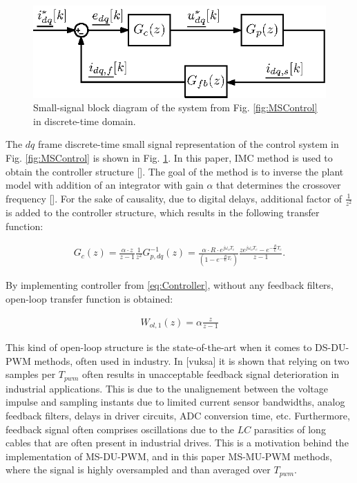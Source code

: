 \documentclass[journal]{IEEEtran}
\begin{document}
\begin{figure}[t!]
    \centerline{\includegraphics[width=0.95\linewidth]{figures/small_signal.eps}}
    \caption{Small-signal block diagram of the system from Fig. \ref{fig:MSControl} in discrete-time domain.}
    \label{fig:SmallSignal}
\end{figure}

The $dq$ frame discrete-time small signal representation of the control system in Fig. \ref{fig:MSControl} is shown in Fig. \ref{fig:SmallSignal}. In this paper, IMC method is used to obtain the controller structure []. The goal of the method is to inverse the plant model with addition of an integrator with gain $\alpha$ that determines the crossover frequency []. For the sake of causality, due to digital delays, additional factor of $\frac{1}{z^2}$ is added to the controller structure, which results in the following transfer function:

\begin{equation}
\begin{aligned}
G_{c}(z) =  \frac{\alpha \cdot z}{z-1} \frac{1}{z^2} G^{-1}_{p,dq}(z)  =   \frac{\alpha \cdot R \cdot e^{j\omega_o T_c}}{\left( 1 - e^{-\frac{R}{L}T_c}\right)}\frac{z e^{j\omega_o T_c}-e^{-\frac{R}{L}T_c}}{z-1}.
\label{eq:Controller} 
\end{aligned}    
\end{equation}

By implementing controller from \eqref{eq:Controller}, without any feedback filters, open-loop transfer function is obtained:

\begin{equation}
\begin{aligned}
W_{ol,1}(z) = \alpha \frac{z}{z-1}
\label{eq:Controller} 
\end{aligned}    
\end{equation}

This kind of open-loop structure is the state-of-the-art when it comes to DS-DU-PWM methods, often used in industry. In [vuksa] it is shown that relying on two samples per $T_{pwm}$ often results in unacceptable feedback signal deterioration in industrial applications. This is due to the unalignement between the voltage impulse and sampling instants due to limited current sensor bandwidths, analog feedback filters, delays in driver circuits, ADC conversion time, etc. Furthermore, feedback signal often comprises oscillations due to the $LC$ parasitics of long cables that are often present in industrial drives. This is a motivation behind the implementation of MS-DU-PWM, and in this paper MS-MU-PWM methods, where the signal is highly oversampled and than averaged over $T_{pwm}$.
\end{document}
